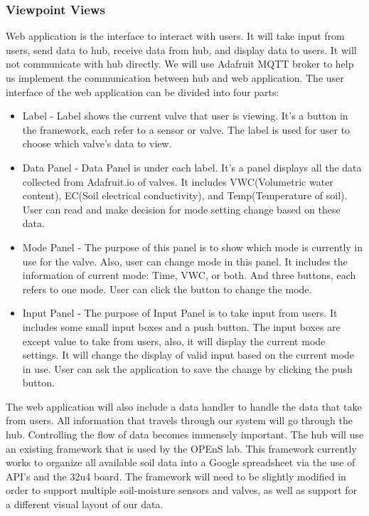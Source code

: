 \documentclass[onecolumn, draftclsnofoot,10pt, compsoc]{IEEEtran}
\newcounter{subsubsubsection}[subsubsection]
\begin{document}
	\subsubsection{Viewpoint Views}
	Web application is the interface to interact with users.
	It will take input from users, send data to hub, receive data from hub, and display data to users. 
	It will not communicate with hub directly. We will use Adafruit MQTT broker to help us implement the communication between hub and web application. The user interface of the web application can be divided into four parts:
	\begin{itemize} 
		\item Label - Label shows the current valve that user is viewing. It’s a button in the framework, each refer to a sensor or valve. The label is used for user to choose which valve’s data to view.
		\item Data Panel - Data Panel is under each label. It’s a panel displays all the data collected from Adafruit.io of valves. It includes VWC(Volumetric water content), EC(Soil electrical conductivity), and Temp(Temperature of soil). User can read and make decision for mode setting change based on these data.
		\item Mode Panel - The purpose of this panel is to show which mode is currently in use for the valve. Also, user can change mode in this panel. It includes the information of current mode: Time, VWC, or both. And three buttons, each refers to one mode. User can click the button to change the mode.
		\item Input Panel - The purpose of Input Panel is to take input from users. It includes some small input boxes and a push button. The input boxes are except value to take from users, also, it will display the current mode settings. It will change the display of valid input based on the current mode in use. User can ask the application to save the change by clicking the push button. 
	\end{itemize}
	The web application will also include a data handler to handle the data that take from users. 
	All information that travels through our system will go through the hub.
	Controlling the flow of data becomes immensely important. 
	The hub will use an existing framework that is used by the OPEnS lab. 
	This framework currently works to organize all available soil data into a Google spreadsheet via the use of API's and the 32u4 board. 
	The framework will need to be slightly modified in order to support multiple soil-moisture sensors and valves, as well as support for a different visual layout of our data.
	
\end{document}
